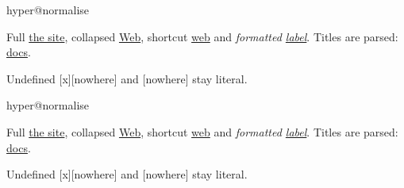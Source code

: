\ifcsname hyper@normalise\endcsname\else\PackageError{mark2tex}{Markdown links require hyperref}{Load \string\usepackage{hyperref} in the document preamble.}\fi
\begin{frame}[t]
Full \href{\detokenize{https://example.org/a_b?x=1&y=2}}{the site}, collapsed \href{\detokenize{https://example.org/a_b?x=1&y=2}}{Web}, shortcut \href{\detokenize{https://example.org/a_b?x=1&y=2}}{web} and \emph{formatted \href{\detokenize{https://example.org/a_b?x=1&y=2}}{label}}.
Titles are parsed: \href{\detokenize{local file.pdf}}{docs}.

Undefined [x][nowhere] and [nowhere] stay literal.

\end{frame}

\ifcsname hyper@normalise\endcsname\else\PackageError{mark2tex}{Markdown links require hyperref}{Load \string\usepackage{hyperref} in the document preamble.}\fi
\begin{frame}[t]
Full \href{\detokenize{https://example.org/a_b?x=1&y=2}}{the site}, collapsed \href{\detokenize{https://example.org/a_b?x=1&y=2}}{Web}, shortcut \href{\detokenize{https://example.org/a_b?x=1&y=2}}{web} and \emph{formatted \href{\detokenize{https://example.org/a_b?x=1&y=2}}{label}}.
Titles are parsed: \href{\detokenize{local file.pdf}}{docs}.

Undefined [x][nowhere] and [nowhere] stay literal.

\end{frame}


